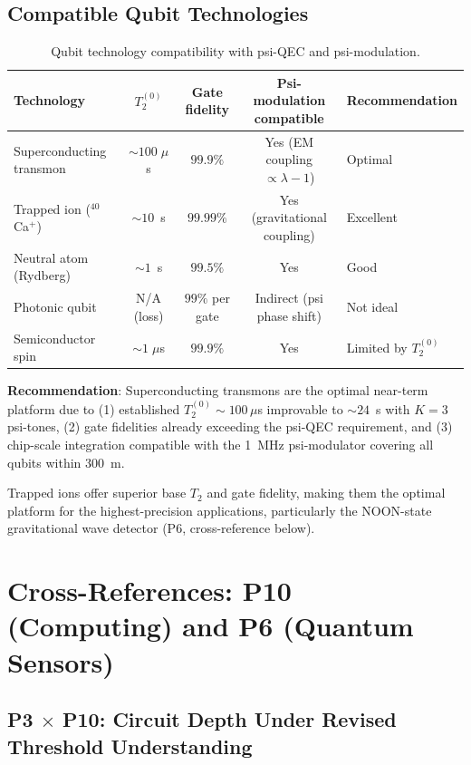 \documentclass[11pt]{article}
\theoremstyle{definition}
\theoremstyle{remark}
\begin{document}
\subsection{Compatible Qubit Technologies}
\label{sec:qubit-tech}

\begin{table}[h]
\centering
\caption{Qubit technology compatibility with psi-QEC and psi-modulation.}
\label{tab:qubit-tech}
\begin{tabular}{@{}lcccl@{}}
\toprule
Technology & $T_2^{(0)}$ & Gate fidelity & Psi-modulation compatible & Recommendation \\
\midrule
Superconducting transmon & $\sim100\;\mu$s & $99.9\%$ & Yes (EM coupling $\propto \lambda-1$) & Optimal \\
Trapped ion ($^{40}$Ca$^+$) & $\sim10$~s & $99.99\%$ & Yes (gravitational coupling) & Excellent \\
Neutral atom (Rydberg) & $\sim1$~s & $99.5\%$ & Yes & Good \\
Photonic qubit & N/A (loss) & $99\%$ per gate & Indirect (psi phase shift) & Not ideal \\
Semiconductor spin & $\sim1\;\mu$s & $99.9\%$ & Yes & Limited by $T_2^{(0)}$ \\
\bottomrule
\end{tabular}
\end{table}

\textbf{Recommendation}: Superconducting transmons are the optimal near-term
platform due to (1) established $T_2^{(0)} \sim 100\,\mu$s improvable to
$\sim 24$~s with $K=3$ psi-tones, (2) gate fidelities already exceeding the
psi-QEC requirement, and (3) chip-scale integration compatible with the
1~MHz psi-modulator covering all qubits within 300~m.

Trapped ions offer superior base $T_2$ and gate fidelity, making them the
optimal platform for the highest-precision applications, particularly the
NOON-state gravitational wave detector (P6, cross-reference below).

\section{Cross-References: P10 (Computing) and P6 (Quantum Sensors)}
\label{sec:cross-refs}

\subsection{P3 $\times$ P10: Circuit Depth Under Revised Threshold Understanding}
\label{sec:p3p10}
\end{document}
